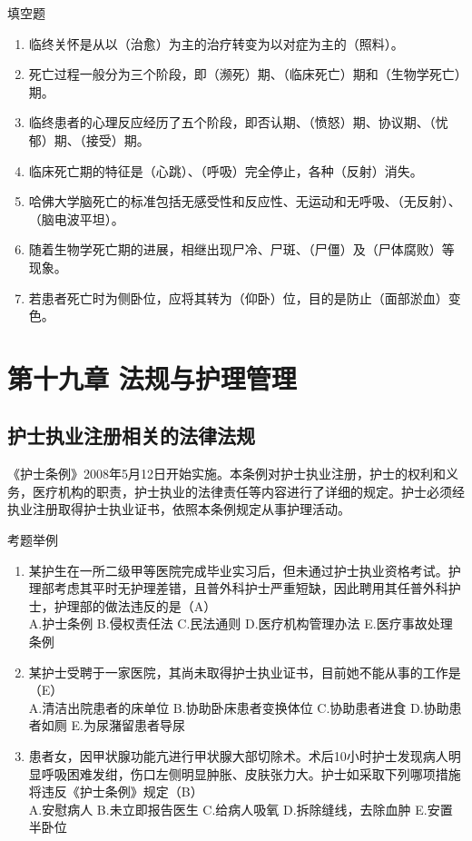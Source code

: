 \documentclass[11pt, a4paper]{ctexart}
\begin{document}
\begin{tipsbox}{填空题}
\begin{enumerate}
    \item 临终关怀是从以（治愈）为主的治疗转变为以对症为主的（照料）。
    \item 死亡过程一般分为三个阶段，即（濒死）期、（临床死亡）期和（生物学死亡）期。
    \item 临终患者的心理反应经历了五个阶段，即否认期、（愤怒）期、协议期、（忧郁）期、（接受）期。
    \item 临床死亡期的特征是（心跳）、（呼吸）完全停止，各种（反射）消失。
    \item 哈佛大学脑死亡的标准包括无感受性和反应性、无运动和无呼吸、（无反射）、（脑电波平坦）。
    \item 随着生物学死亡期的进展，相继出现尸冷、尸斑、（尸僵）及（尸体腐败）等现象。
    \item 若患者死亡时为侧卧位，应将其转为（仰卧）位，目的是防止（面部淤血）变色。
\end{enumerate}
\end{tipsbox}

\section{第十九章 法规与护理管理}
\subsection{护士执业注册相关的法律法规}
《护士条例》2008年5月12日开始实施。本条例对护士执业注册，护士的权利和义务，医疗机构的职责，护士执业的法律责任等内容进行了详细的规定。护士必须经执业注册取得护士执业证书，依照本条例规定从事护理活动。

\begin{examplebox}{考题举例}
\begin{enumerate}
    \item 某护生在一所二级甲等医院完成毕业实习后，但未通过护士执业资格考试。护理部考虑其平时无护理差错，且普外科护士严重短缺，因此聘用其任普外科护士，护理部的做法违反的是（A）\\
    A.护士条例 \quad B.侵权责任法 \quad C.民法通则 \quad D.医疗机构管理办法 \quad E.医疗事故处理条例
    \item 某护士受聘于一家医院，其尚未取得护士执业证书，目前她不能从事的工作是（E）\\
    A.清洁出院患者的床单位 \quad B.协助卧床患者变换体位 \quad C.协助患者进食 \quad D.协助患者如厕 \quad E.为尿潴留患者导尿
    \item 患者女，因甲状腺功能亢进行甲状腺大部切除术。术后10小时护士发现病人明显呼吸困难发绀，伤口左侧明显肿胀、皮肤张力大。护士如采取下列哪项措施将违反《护士条例》规定（B）\\
    A.安慰病人 \quad B.未立即报告医生 \quad C.给病人吸氧 \quad D.拆除缝线，去除血肿 \quad E.安置半卧位
\end{enumerate}
\end{examplebox}
\end{document}
